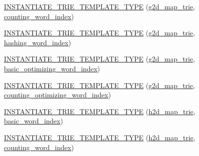 \begin{DoxyCompactItemize}
\item 
\hyperlink{namespaceuva_1_1smt_1_1bpbd_1_1server_1_1lm_a2240cf5b2a72258f680c26bde69ad79a}{I\+N\+S\+T\+A\+N\+T\+I\+A\+T\+E\+\_\+\+T\+R\+I\+E\+\_\+\+T\+E\+M\+P\+L\+A\+T\+E\+\_\+\+T\+Y\+P\+E} (\hyperlink{classuva_1_1smt_1_1bpbd_1_1server_1_1lm_1_1g2d__map__trie}{g2d\+\_\+map\+\_\+trie}, \hyperlink{classuva_1_1smt_1_1bpbd_1_1server_1_1lm_1_1dictionary_1_1counting__word__index}{counting\+\_\+word\+\_\+index})
\item 
\hyperlink{namespaceuva_1_1smt_1_1bpbd_1_1server_1_1lm_abbf5dee8399dbe774a3994f54c2c95f9}{I\+N\+S\+T\+A\+N\+T\+I\+A\+T\+E\+\_\+\+T\+R\+I\+E\+\_\+\+T\+E\+M\+P\+L\+A\+T\+E\+\_\+\+T\+Y\+P\+E} (\hyperlink{classuva_1_1smt_1_1bpbd_1_1server_1_1lm_1_1g2d__map__trie}{g2d\+\_\+map\+\_\+trie}, \hyperlink{classuva_1_1smt_1_1bpbd_1_1server_1_1lm_1_1dictionary_1_1hashing__word__index}{hashing\+\_\+word\+\_\+index})
\item 
\hyperlink{namespaceuva_1_1smt_1_1bpbd_1_1server_1_1lm_a64709ecddeb088e8e4f933c0c7d358e9}{I\+N\+S\+T\+A\+N\+T\+I\+A\+T\+E\+\_\+\+T\+R\+I\+E\+\_\+\+T\+E\+M\+P\+L\+A\+T\+E\+\_\+\+T\+Y\+P\+E} (\hyperlink{classuva_1_1smt_1_1bpbd_1_1server_1_1lm_1_1g2d__map__trie}{g2d\+\_\+map\+\_\+trie}, \hyperlink{namespaceuva_1_1smt_1_1bpbd_1_1server_1_1lm_1_1dictionary_a3001583c904eec702b4a4125082a7ecd}{basic\+\_\+optimizing\+\_\+word\+\_\+index})
\item 
\hyperlink{namespaceuva_1_1smt_1_1bpbd_1_1server_1_1lm_aea0b81614547618764ea6c574d046d34}{I\+N\+S\+T\+A\+N\+T\+I\+A\+T\+E\+\_\+\+T\+R\+I\+E\+\_\+\+T\+E\+M\+P\+L\+A\+T\+E\+\_\+\+T\+Y\+P\+E} (\hyperlink{classuva_1_1smt_1_1bpbd_1_1server_1_1lm_1_1g2d__map__trie}{g2d\+\_\+map\+\_\+trie}, \hyperlink{namespaceuva_1_1smt_1_1bpbd_1_1server_1_1lm_1_1dictionary_a61cbd647b15de785ccf4cdd26661c366}{counting\+\_\+optimizing\+\_\+word\+\_\+index})
\item 
\hyperlink{namespaceuva_1_1smt_1_1bpbd_1_1server_1_1lm_a1b201105e319e067c2fd367f79280f9b}{I\+N\+S\+T\+A\+N\+T\+I\+A\+T\+E\+\_\+\+T\+R\+I\+E\+\_\+\+T\+E\+M\+P\+L\+A\+T\+E\+\_\+\+T\+Y\+P\+E} (\hyperlink{classuva_1_1smt_1_1bpbd_1_1server_1_1lm_1_1h2d__map__trie}{h2d\+\_\+map\+\_\+trie}, \hyperlink{classuva_1_1smt_1_1bpbd_1_1server_1_1lm_1_1dictionary_1_1basic__word__index}{basic\+\_\+word\+\_\+index})
\item 
\hyperlink{namespaceuva_1_1smt_1_1bpbd_1_1server_1_1lm_a63a8b8747fdc94a181a7ce67261976f0}{I\+N\+S\+T\+A\+N\+T\+I\+A\+T\+E\+\_\+\+T\+R\+I\+E\+\_\+\+T\+E\+M\+P\+L\+A\+T\+E\+\_\+\+T\+Y\+P\+E} (\hyperlink{classuva_1_1smt_1_1bpbd_1_1server_1_1lm_1_1h2d__map__trie}{h2d\+\_\+map\+\_\+trie}, \hyperlink{classuva_1_1smt_1_1bpbd_1_1server_1_1lm_1_1dictionary_1_1counting__word__index}{counting\+\_\+word\+\_\+index})

\end{DoxyCompactItemize}
